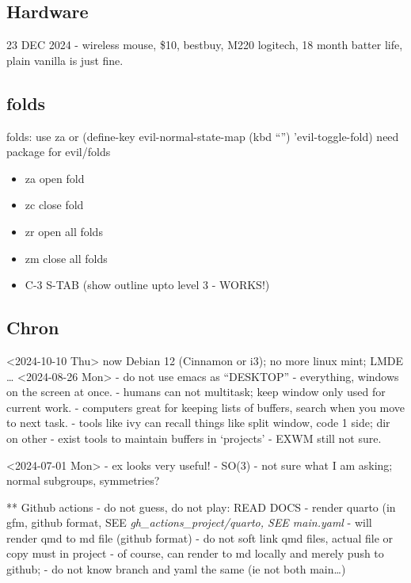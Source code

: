\documentclass[
]{report}
\providecommand{\tightlist}{%
  \setlength{\itemsep}{0pt}\setlength{\parskip}{0pt}}\usepackage{longtable,booktabs,array}
\begin{document}
\subsection{Hardware}\label{hardware}

23 DEC 2024 - wireless mouse, \$10, bestbuy, M220 logitech, 18 month
batter life, plain vanilla is just fine.

\subsection{folds}\label{folds}

folds: use za or (define-key evil-normal-state-map (kbd ``'')
'evil-toggle-fold) need package for evil/folds\\

\begin{itemize}
\tightlist
\item
  za open fold\\
\item
  zc close fold\\
\item
  zr open all folds
\item
  zm close all folds
\item
  C-3 S-TAB (show outline upto level 3 - WORKS!)
\end{itemize}

\subsection{Chron}\label{chron}

\textless2024-10-10 Thu\textgreater{} now Debian 12 (Cinnamon or i3); no
more linux mint; LMDE \ldots{} \textless2024-08-26 Mon\textgreater{} -
do not use emacs as ``DESKTOP'' - everything, windows on the screen at
once. - humans can not multitask; keep window only used for current
work. - computers great for keeping lists of buffers, search when you
move to next task. - tools like ivy can recall things like split window,
code 1 side; dir on other - exist tools to maintain buffers in
`projects' - EXWM still not sure.

\textless2024-07-01 Mon\textgreater{} - ex looks very useful! - SO(3) -
not sure what I am asking; normal subgroups, symmetries?

** Github actions - do not guess, do not play: READ DOCS - render quarto
(in gfm, github format, SEE \emph{gh\_actions\_project/quarto, SEE
main.yaml} - will render qmd to md file (github format) - do not soft
link qmd files, actual file or copy must in project - of course, can
render to md locally and merely push to github; - do not know branch and
yaml the same (ie not both main\ldots)
\end{document}
